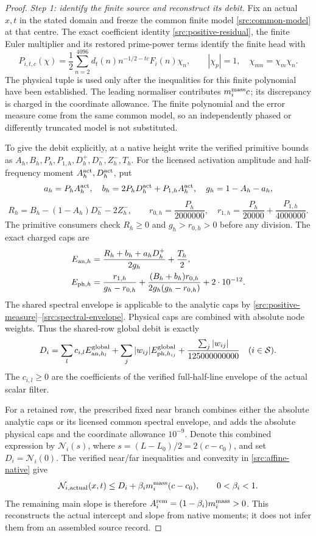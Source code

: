 \documentclass[11pt,a4paper]{article}
\theoremstyle{definition}
\theoremstyle{remark}
\begin{document}
\begin{proof}
\emph{Step 1: identify the finite source and reconstruct its debit.}
Fix an actual $x,t$ in the stated domain and freeze the common finite
model \eqref{src:common-model} at that centre.  The exact coefficient
identity \eqref{src:positive-residual}, the finite Euler multiplier and
its restored prime-power terms identify the finite head with
\[
 P_{i,t,c}(\chi)=\frac12\sum_{n=2}^{4096}
 d_t(n)n^{-1/2-tc}F_i(n)\chi_n,
 \qquad |\chi_p|=1,\quad \chi_{mn}=\chi_m\chi_n.
\]
The physical tuple is used only after the inequalities for this finite
polynomial have been established.  The leading normaliser contributes
$m_i^{\rm mass}c$; its discrepancy is charged in the coordinate allowance.
The finite polynomial and the error measure come from the same common
model, so an independently phased or differently truncated model is
not substituted.

To give the debit explicitly, at a native height write the verified
primitive bounds as $A_h,B_h,P_h,P_{1,h},D_h^+,D_h^-,Z_h^-,T_h$.
For the licensed activation amplitude and half-frequency moment
$A_h^{\rm act},D_h^{\rm act}$, put
\[
 a_h=P_hA_h^{\rm act},\quad
 b_h=2P_hD_h^{\rm act}+P_{1,h}A_h^{\rm act},\quad
 g_h=1-A_h-a_h,
\]
\[
 R_h=B_h-(1-A_h)D_h^--2Z_h^-,\qquad
 r_{0,h}=\frac{P_h}{2000000},\quad
 r_{1,h}=\frac{P_h}{20000}+\frac{P_{1,h}}{4000000}.
\]
The primitive consumers check $R_h\ge0$ and $g_h>r_{0,h}>0$ before
any division.  The exact charged caps are
\begin{align}
 E_{{\rm an},h}
 &=\frac{R_h+b_h+a_hD_h^+}{2g_h}+\frac{T_h}{2},\notag\\
 E_{{\rm ph},h}
 &=\frac{r_{1,h}}{g_h-r_{0,h}}
   +\frac{(B_h+b_h)r_{0,h}}{2g_h(g_h-r_{0,h})}
   +2\cdot10^{-12}.
 \label{direct67:native-caps}
\end{align}
The shared spectral envelope is applicable to the analytic caps by
\eqref{src:positive-measure}--\eqref{src:spectral-envelope}.
Physical caps are combined with absolute node weights.  Thus the
shared-row global debit is exactly
\[
 D_i=\sum_l c_{i,l}E_{{\rm an},h_l}^{\rm global}
      +\sum_j|w_{ij}|E_{{\rm ph},h_{ij}}^{\rm global}
      +\frac{\sum_j|w_{ij}|}{125000000000}
       \quad(i\in\mathcal S).
\]
The $c_{i,l}\ge0$ are the coefficients of the verified full-half-line
envelope of the actual scalar filter.

For a retained row, the prescribed fixed near branch combines either
the absolute analytic caps or its licensed common spectral envelope,
and adds the absolute physical caps and the coordinate allowance
$10^{-9}$.  Denote this combined expression by $\mathcal N_i(s)$,
where $s=(L-L_0)/2=2(c-c_0)$, and set $D_i=\mathcal N_i(0)$.
The verified near/far inequalities and convexity in
\eqref{src:affine-native} give
\[
 \mathcal N_{i,\rm actual}(x,t)
 \le D_i+\beta_i m_i^{\rm mass}(c-c_0),\qquad 0<\beta_i<1.
\]
The remaining main slope is therefore
$A_i^{\rm rem}=(1-\beta_i)m_i^{\rm mass}>0$.
This reconstructs the actual intercept and slope from native moments;
it does not infer them from an assembled source record.


\end{proof}
\end{document}
